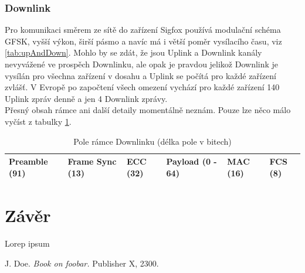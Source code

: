\documentclass{ctuthesis}
\begin{document}
\subsection{Downlink}
Pro komunikaci směrem ze sítě do zařízení Sigfox používá modulační schéma GFSK, vyšší výkon, širší pásmo a navíc má i větší poměr vysílacího času, viz \ref{tab:upAndDown}. Mohlo by se zdát, že jsou Uplink a Downlink kanály nevyvážené ve prospěch Downlinku, ale opak je pravdou jelikož Downlink je vysílán pro všechna zařízení v dosahu a Uplink se počítá pro každé zařízení zvlášť. V Evropě po započtení všech omezení vychází pro každé zařízení 140 Uplink zpráv denně a jen 4 Downlink zprávy.\\
Přesný obsah rámce ani další detaily momentálně neznám. Pouze lze něco málo vyčíst z tabulky \ref{tab:downlinkFrame}.
\begin{table}[]
\begin{tabular}{@{}|l|l|l|l|l|l|@{}}
\toprule
Preamble (91) & Frame Sync (13) & ECC (32) & Payload (0 - 64) & MAC (16) & FCS (8) \\ \bottomrule
\end{tabular}
\caption{Pole rámce Downlinku (délka pole v bitech)}
\label{tab:downlinkFrame}
\end{table}

\chapter{Závěr}

Lorep ipsum \cite{doe}

\begin{thebibliography}{1}

 J. Doe. \emph{Book on foobar.} Publisher X,
 2300.

\end{thebibliography}
\end{document}
